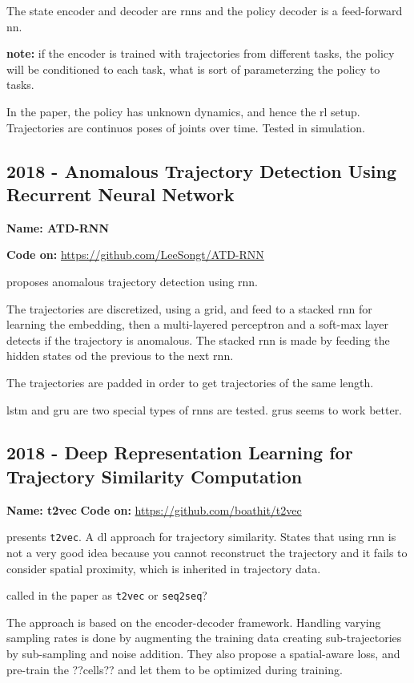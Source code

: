 The state encoder and decoder are \glspl{rnn} and the policy decoder is a feed-forward \gls{nn}.

\textbf{note:} if the encoder is trained with trajectories from different tasks, the policy will be conditioned to each task, what is sort of parameterzing the policy to tasks. 

In the paper, the policy has unknown dynamics, and hence the \gls{rl} setup. Trajectories are continuos poses of joints over time. Tested in simulation. 

\subsection*{2018 - Anomalous Trajectory Detection Using Recurrent Neural Network}

\textbf{Name: ATD-RNN}

\textbf{Code on:} \url{https://github.com/LeeSongt/ATD-RNN}

\cite{song2018anomalous} proposes anomalous trajectory detection using \gls{rnn}.

The trajectories are discretized, using a grid, and feed to a stacked \gls{rnn} for learning the embedding, then a multi-layered perceptron and a soft-max layer detects if the trajectory is anomalous.
%
The stacked \gls{rnn} is made by feeding the hidden states od the previous to the next \gls{rnn}.

The trajectories are padded in order to get trajectories of the same length.

\gls{lstm} and \gls{gru} are two special types of \glspl{rnn} are tested. \glspl{gru} seems to work better.

\subsection*{2018 - Deep Representation Learning for Trajectory Similarity Computation}

\textbf{Name: t2vec}
\textbf{Code on:} \url{https://github.com/boathit/t2vec}

\cite{li2018deep} presents \texttt{t2vec}. A \gls{dl} approach for trajectory similarity. States that using \gls{rnn} is not a very good idea because you cannot reconstruct the trajectory and it fails to consider spatial proximity, which is inherited in trajectory data.

called in the paper as \texttt{t2vec} or \texttt{seq2seq}?

The approach is based on the encoder-decoder framework.
%
Handling varying sampling rates is done by augmenting the training data creating sub-trajectories by sub-sampling and noise addition. They also propose a spatial-aware loss, and pre-train the ??cells?? and let them to be optimized during training.

